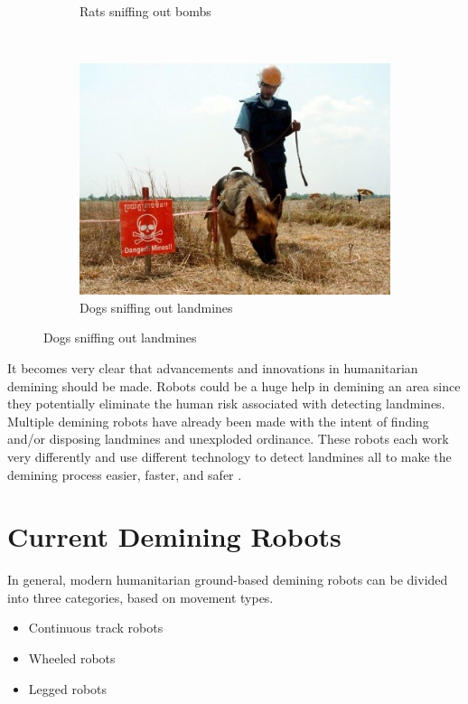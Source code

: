\begin{figure} [H]
\begin{subfigure}[b]{0.28\textwidth}
        \caption{Rats sniffing out bombs}
        \label{fig:rat_finding_mines}
    \end{subfigure}
    ~ %
    \begin{subfigure}[b]{0.28\textwidth}
        \includegraphics[width=\textwidth]{00 - Images/dog_finding_mines.jpg}
        \caption{Dogs sniffing out landmines}
        \label{fig:dog_finding_mines}
    \end{subfigure}
\end{figure}

It becomes very clear that advancements and innovations in humanitarian demining should be made. Robots could be a huge help in demining an area since they potentially eliminate the human risk associated with detecting landmines. Multiple demining robots have already been made with the intent of finding and/or disposing landmines and unexploded ordinance. These robots each work very differently and use different technology to detect landmines all to make the demining process easier, faster, and safer \cite{MotionPlanningRobot2011}.

\section{Current Demining Robots}

In general, modern humanitarian ground-based demining robots can be divided into three categories, based on movement types.
\begin{itemize}
\setlength{\itemsep}{0.05\baselineskip}
	\item Continuous track robots
	\item Wheeled robots
	\item Legged robots
\end{itemize}


